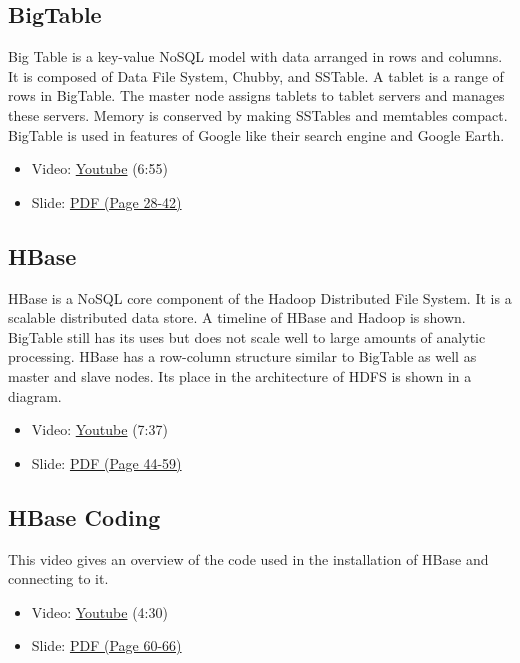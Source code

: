 \subsection{BigTable}\label{bigtable}

Big Table is a key-value NoSQL model with data arranged in rows and
columns. It is composed of Data File System, Chubby, and SSTable. A
tablet is a range of rows in BigTable. The master node assigns tablets
to tablet servers and manages these servers. Memory is conserved by
making SSTables and memtables compact. BigTable is used in features of
Google like their search engine and Google Earth.

\begin{itemize}
\tightlist
\item
  Video: \href{https://www.youtube.com/watch?v=JAlz9AI5I-M}{Youtube}
  (6:55)
\item
  Slide:
  \href{https://drive.google.com/open?id=0B88HKpainTSfaDFNbjNiMm44bnc}{PDF
  (Page 28-42)}
\end{itemize}

\subsection{HBase}\label{hbase}

HBase is a NoSQL core component of the Hadoop Distributed File System.
It is a scalable distributed data store. A timeline of HBase and Hadoop
is shown. BigTable still has its uses but does not scale well to large
amounts of analytic processing. HBase has a row-column structure similar
to BigTable as well as master and slave nodes. Its place in the
architecture of HDFS is shown in a diagram.

\begin{itemize}
\tightlist
\item
  Video: \href{https://www.youtube.com/watch?v=i-ibhuVs-ck}{Youtube}
  (7:37)
\item
  Slide:
  \href{https://drive.google.com/open?id=0B88HKpainTSfaDFNbjNiMm44bnc}{PDF
  (Page 44-59)}
\end{itemize}

\subsection{HBase Coding}\label{hbase-coding}

This video gives an overview of the code used in the installation of
HBase and connecting to it.

\begin{itemize}
\tightlist
\item
  Video: \href{https://www.youtube.com/watch?v=KbFMpYRBTtU}{Youtube}
  (4:30)
\item
  Slide:
  \href{https://drive.google.com/open?id=0B88HKpainTSfaDFNbjNiMm44bnc}{PDF
  (Page 60-66)}
\end{itemize}

